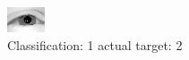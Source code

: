 \begin{figure}[h!]
\begin{center}
\includegraphics[width=0.60\columnwidth]{figures/ID2243_class_1_target_2.png}
\end{center}
\caption{ Classification: 1 actual target: 2}
\label{fig:ID2243_class_1_target_2}
\end{figure}
